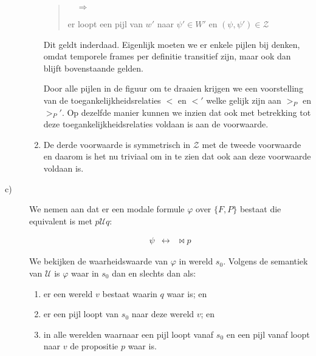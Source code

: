 \documentclass[a4paper,11pt]{article}
\begin{document}
\begin{description}
\begin{enumerate}
\begin{quote}
$\quad \Longrightarrow$

er loopt een pijl van $w'$ naar $\psi' \in W'$ en $(\psi,\psi') \in \mathcal{Z}$

\end{quote}

Dit geldt inderdaad. Eigenlijk moeten we er enkele pijlen bij denken, omdat
temporele frames per definitie transitief zijn, maar ook dan blijft
bovenstaande gelden.

Door alle pijlen in de figuur om te draaien krijgen we een voorstelling van de
toegankelijkheidsrelaties $<$ en $<'$ welke gelijk zijn aan $>_{P}$ en
$>_{P}'$. Op dezelfde manier kunnen we inzien dat ook met betrekking tot deze
toegankelijkheidsrelaties voldaan is aan de voorwaarde.

\item

De derde voorwaarde is symmetrisch in $\mathcal{Z}$ met de tweede voorwaarde
en daarom is het nu triviaal om in te zien dat ook aan deze voorwaarde voldaan
is.

\end{enumerate}

\item[c)]

We nemen aan dat er een modale formule $\varphi$ over $\{F,P\}$ bestaat die
equivalent is met $p \mathcal{U} q$:

\begin{eqnarray*}
\psi & \leftrightarrow & \bowtie p
\end{eqnarray*}

We bekijken de waarheidswaarde van $\varphi$ in wereld $s_{0}$. Volgens de
semantiek van $\mathcal{U}$ is $\varphi$ waar in $s_{0}$ dan en slechts dan
als:

\begin{enumerate}

\item

er een wereld $v$ bestaat waarin $q$ waar is; en

\item

er een pijl loopt van $s_{0}$ naar deze wereld $v$; en

\item

in alle werelden waarnaar een pijl loopt vanaf $s_{0}$ en een pijl vanaf loopt
naar $v$ de propositie $p$ waar is.

\end{enumerate}


\end{description}
\end{document}
